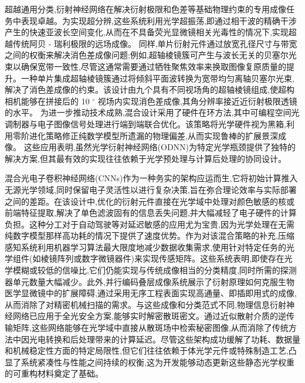 超越通用分类,衍射神经网络在解决衍射极限和色差等基础物理约束的专用成像任务中表现卓越。为实现超分辨,这些系统利用光学超振荡,即通过相干波的精确干涉产生的快速亚波长空间变化,从而在不具备荧光显微镜相关光毒性的情况下,实现超越传统阿贝 - 瑞利极限的远场成像。\citep{doi_10_1117_12_2576293_e7634e1d} \citep{doi_10_1109_cleo_europe_eqec57999_2023_10231830_c702ffd4} 同样,单片衍射元件通过放宽孔径尺寸与带宽之间的权衡来解决消色差成像问题;例如,超轴棱镜簇可产生与波长无关的贝塞尔光束以确保宽带一致性,尽管这通常需要通过牺牲聚焦效率来换取图像复原质量的提升。一种单片集成超轴棱镜簇通过将倾斜平面波转换为宽带均匀离轴贝塞尔光束,解决了消色差成像的约束。该设计由九个具有不同视场角的超轴棱镜组成,使超构相机能够在拼接后的 10 \(^\circ\) 视场内实现消色差成像,其角分辨率接近近衍射极限透镜的水平。\citep{doi_10_1038_s41377_026_02272_y_42e58df2} 为进一步推动技术成熟,混合设计采用了硬件在环方法,其中可编程空间光调制器与电子图像信号处理进行端到端联合优化。该策略将光学硬件视为黑箱,利用零阶进化策略修正纯数学模型所遗漏的物理偏差,从而实现鲁棒的扩展景深成像。\citep{doi_10_1364_oe_461549_b2d41b3f} 这些应用表明,虽然光学衍射神经网络(ODNN)为特定光学瓶颈提供了独特的解决方案,但其最有效的实现往往依赖于光学预处理与计算后处理的协同设计。\citep{doi_10_1117_1_ap_6_5_056004_3f240d06} \citep{doi_10_1038_s41377_026_02272_y_42e58df2} \citep{doi_10_1364_oe_461549_b2d41b3f}

混合光电子卷积神经网络(CNNs)作为一种务实的架构应运而生,它将初始计算推入无源光学领域,同时保留电子灵活性以进行复杂决策,旨在弥合理论效率与实际部署之间的差距。在该设计中,优化的衍射元件直接在光学域中处理对颜色敏感的核或前端特征提取,解决了单色滤波固有的信息丢失问题,并大幅减轻了电子硬件的计算负担。这种分工对于自动驾驶等对延迟敏感的应用尤为宝贵,因为光学处理在无需纯数字模型那样高功耗的情况下提供了速度优势。作为对该混合策略的补充,压缩感知系统利用机器学习算法最大限度地减少数据收集需求,使用针对特定任务的光学组件(如棱镜阵列或数字微镜器件)来实现传感矩阵。这些系统表明,即使存在光学模糊或较低的信噪比,它们仍能实现与传统成像相当的分类精度,同时所需的探测器单元数量大幅减少。此外,并行编码叠层成像系统展示了衍射原理如何克服生物医学显微镜中的扩展障碍,通过采用无序工程表面实现高通量、即插即用式的成像,从而消除了对精密机械扫描的需求。与这些成像和分类范式不同,物理信息衍射神经网络已应用于全光安全方案,能够实时解密散斑密文。通过近似散射介质的逆传输矩阵,这些网络能够在光学域中直接从散斑场中检索秘密图像,从而消除了传统方法中因光电转换和后处理带来的计算延迟。尽管这些架构成功缓解了功耗、数据量和机械稳定性方面的特定局限性,但它们往往依赖于体光学元件或特殊制造工艺,凸显了系统紧凑性与性能之间持续的权衡,这为开发能够动态更新这些静态光学权重的可重构材料奠定了基础。\citep{doi_10_1038_s41598_018_30619_y_5f5bfb09} \citep{doi_10_1117_1_oe_59_5_051404_363a991a} \citep{doi_10_1021_acsphotonics_1c01085_479fdea3} \citep{doi_10_1117_1_apn_5_1_016010_3e30c230}

